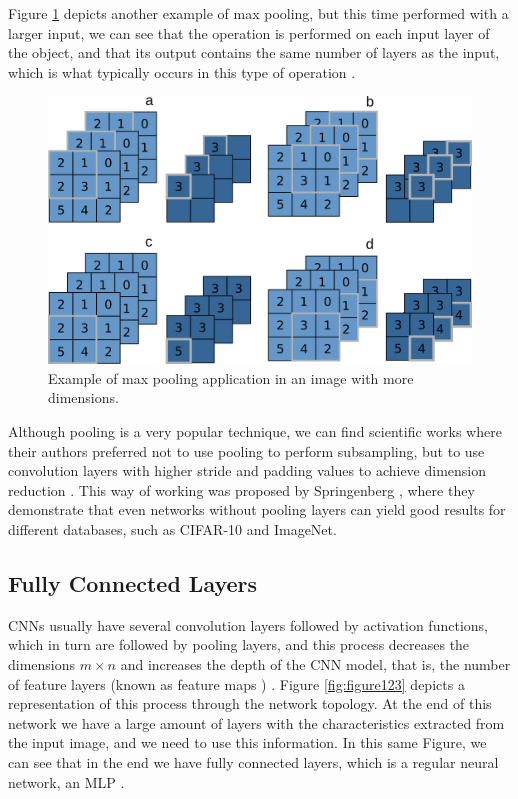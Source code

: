 Figure \ref{fig:figure122} depicts another example of max pooling, but this time performed with a larger input, we can see that the operation is performed on each input layer of the object, and that its output contains the same number of layers as the input, which is what typically occurs in this type of operation \cite{geron2019}.

\begin{figure}
    \centering
    \includegraphics[scale=0.30]{"Part 3 - Learning Systems/Supervised Learning/Deep Learning/images/figure122.png"}
    \caption{Example of max pooling application in an image with more dimensions.}
    \label{fig:figure122}
\end{figure}

Although pooling is a very popular technique, we can find scientific works where their authors preferred not to use pooling to perform subsampling, but to use convolution layers with higher stride and padding values to achieve dimension reduction \cite{elgendy2020}\cite{adrian2017}. This way of working was proposed by Springenberg \cite{springenberg2014striving}, where they demonstrate that even networks without pooling layers can yield good results for different databases, such as CIFAR-10 and ImageNet.

\subsection{Fully Connected Layers}

CNNs usually have several convolution layers followed by activation functions, which in turn are followed by pooling layers, and this process decreases the dimensions $m \times n$ and increases the depth of the CNN model, that is, the number of feature layers (known as feature maps ) \cite{elgendy2020}\cite{geron2019}. Figure \ref{fig:figure123} depicts a representation of this process through the network topology. At the end of this network we have a large amount of layers with the characteristics extracted from the input image, and we need to use this information. In this same Figure, we can see that in the end we have fully connected layers, which is a regular neural network, an MLP \cite{elgendy2020}.

